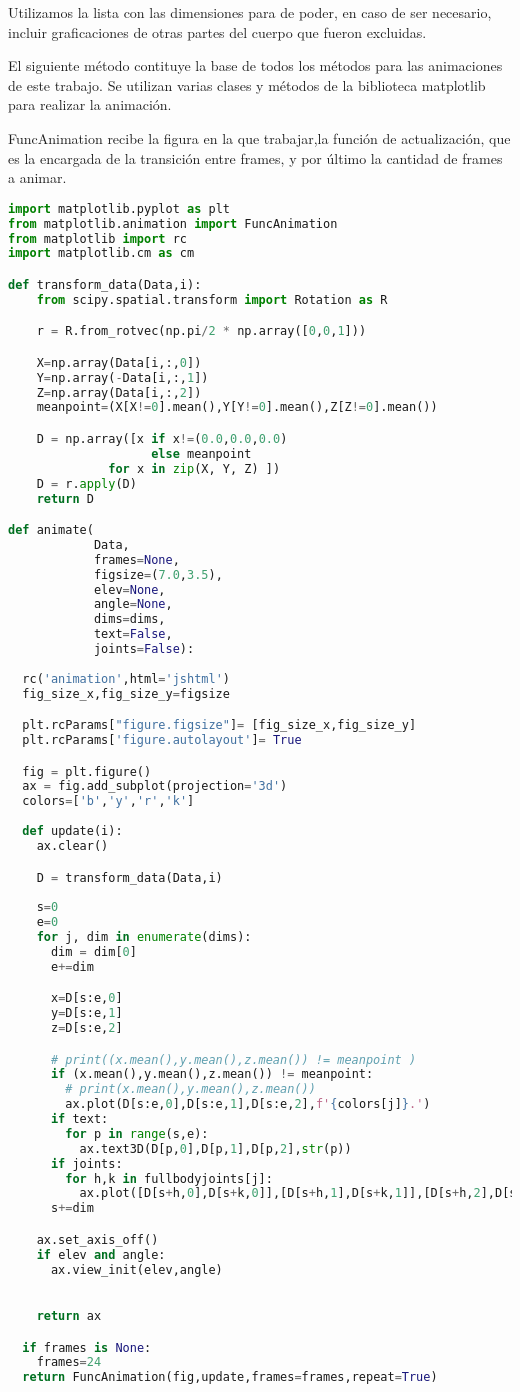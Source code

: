 Utilizamos la lista con las dimensiones para de poder, en caso de ser necesario, incluir graficaciones de otras partes del cuerpo que fueron excluidas.

El siguiente método contituye la base de todos los métodos para las animaciones de este trabajo.
Se utilizan varias clases y métodos de la biblioteca matplotlib para realizar la animación.

FuncAnimation recibe la figura en la que trabajar,la función de actualización, que es la encargada de la transición entre frames, y por último la cantidad de frames a animar.

\begin{lstlisting}[language=Python, caption={Método base para animar }]
import matplotlib.pyplot as plt
from matplotlib.animation import FuncAnimation
from matplotlib import rc
import matplotlib.cm as cm

def transform_data(Data,i):
    from scipy.spatial.transform import Rotation as R

    r = R.from_rotvec(np.pi/2 * np.array([0,0,1]))

    X=np.array(Data[i,:,0])
    Y=np.array(-Data[i,:,1])
    Z=np.array(Data[i,:,2])
    meanpoint=(X[X!=0].mean(),Y[Y!=0].mean(),Z[Z!=0].mean())

    D = np.array([x if x!=(0.0,0.0,0.0) 
                    else meanpoint
              for x in zip(X, Y, Z) ])
    D = r.apply(D)
    return D

def animate(
			Data,
			frames=None,
			figsize=(7.0,3.5),
			elev=None,
			angle=None,
			dims=dims,
			text=False,
			joints=False):
			
  rc('animation',html='jshtml')
  fig_size_x,fig_size_y=figsize

  plt.rcParams["figure.figsize"]= [fig_size_x,fig_size_y]
  plt.rcParams['figure.autolayout']= True

  fig = plt.figure()
  ax = fig.add_subplot(projection='3d')
  colors=['b','y','r','k']
  
  def update(i):
    ax.clear()

	D = transform_data(Data,i)	
	
    s=0
    e=0
    for j, dim in enumerate(dims):
      dim = dim[0]
      e+=dim

      x=D[s:e,0]
      y=D[s:e,1]
      z=D[s:e,2]

      # print((x.mean(),y.mean(),z.mean()) != meanpoint )
      if (x.mean(),y.mean(),z.mean()) != meanpoint:
        # print(x.mean(),y.mean(),z.mean())
        ax.plot(D[s:e,0],D[s:e,1],D[s:e,2],f'{colors[j]}.')
      if text:
        for p in range(s,e):
          ax.text3D(D[p,0],D[p,1],D[p,2],str(p))
      if joints:
        for h,k in fullbodyjoints[j]:
          ax.plot([D[s+h,0],D[s+k,0]],[D[s+h,1],D[s+k,1]],[D[s+h,2],D[s+k,2]],f'{colors[j]}')
      s+=dim

    ax.set_axis_off()
    if elev and angle:
      ax.view_init(elev,angle) 

    
    return ax

  if frames is None:
    frames=24
  return FuncAnimation(fig,update,frames=frames,repeat=True)
\end{lstlisting}

